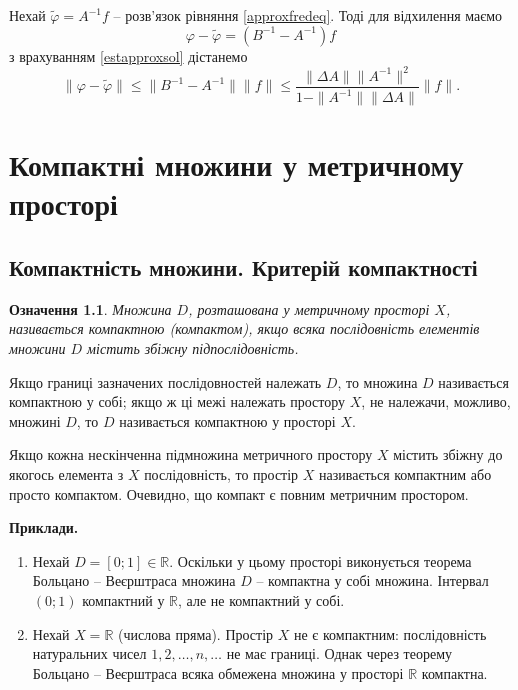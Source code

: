 \documentclass[14pt,twoside]{extreport}
\theoremstyle{mystyle}
\newtheorem{dfn}{Означення}
\numberwithin{equation}{chapter}
\begin{document}
Нехай $\tilde{\varphi} = A^{-1} f$ -- розв'язок рівняння \eqref{approxfredeq}. Тоді для відхилення маємо
\[
 \varphi - \tilde{\varphi} = (B^{-1} - A^{-1}) f
\]
з врахуванням \eqref{estapproxsol} дістанемо
\begin{equation}
 \|\varphi - \tilde{\varphi} \| \leqslant \|B^{-1} - A^{-1} \| \|f\| \leqslant \frac{\|\Delta A\| \|A^{-1}\|^2}{1-\|A^{-1}\|\|\Delta A\|} \|f\|.
\end{equation}


\chapter{Компактні множини у метричному просторі}

\section{Компактність множини. Критерій компактності}

\begin{dfn}
	Множина $D$, розташована у метричному просторі $X$, називається компактною (компактом), якщо всяка послідовність елементів множини $D$ містить збіжну підпослідовність.
\end{dfn}

Якщо границі зазначених послідовностей належать $D$, то множина $D$ називається компактною у собі; якщо ж ці межі належать простору $X$, не належачи, можливо, множині $D$, то $D$ називається компактною у просторі $X$.

Якщо кожна нескінченна підмножина метричного простору $X$ містить збіжну до якогось елемента з $X$ послідовність, то простір $X$ називається компактним або просто компактом. Очевидно, що компакт є повним метричним простором.

\textbf{Приклади.}
\begin{enumerate}
	\item Нехай $D = [0; 1] \in \mathbb{R}$. Оскільки у цьому просторі виконується теорема Больцано -- Веєрштраса множина $D$ -- компактна у собі множина. Інтервал $(0; 1)$ компактний у $\mathbb{R}$, але не компактний у собі.
	\item Нехай $X = \mathbb{R}$ (числова пряма). Простір $X$ не є компактним: послідовність натуральних чисел $1, 2, \ldots, n, \ldots$ не має границі. Однак через теорему Больцано -- Веєрштраса всяка обмежена множина у просторі $\mathbb{R}$ компактна.
\end{enumerate}
\end{document}
